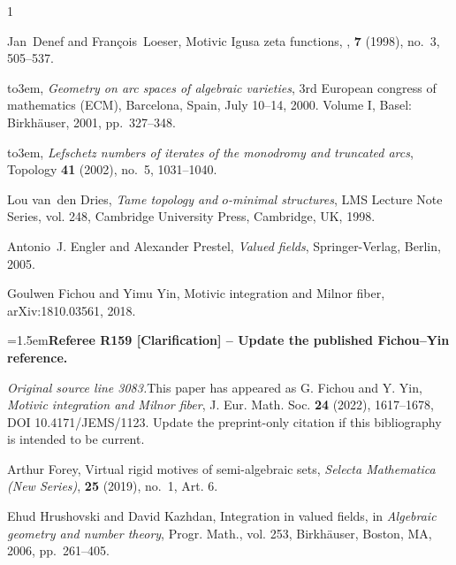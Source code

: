 \documentclass[12pt]{amsart}
\newcommand{\RefereeRemark}[4]{%
  \par\medskip\begingroup\normalfont\small\color{RefereePurple}%
  \emergencystretch=1.5em\noindent\textbf{Referee R#1 [#2] -- #3.}\par\nobreak\noindent #4\par
  \endgroup\medskip
}
\theoremstyle{plain}
\theoremstyle{definition}
\theoremstyle{remark}
\numberwithin{equation}{section}
\theoremstyle{plain}
\newcommand{\omin}{$o$\nobreakdash}
\newcommand{\0}{\emptyset}
\begin{document}
\providecommand{\bysame}{\leavevmode\hbox to3em{\hrulefill}\thinspace}
\providecommand{\MR}{\relax\ifhmode\unskip\space\fi MR }
\providecommand{\MRhref}[2]{%
  \href{http://www.ams.org/mathscinet-getitem?mr=#1}{#2}
}
\providecommand{\href}[2]{#2}
\begin{thebibliography}{1}

Jan~Denef and Fran\c cois~Loeser,
\newblock Motivic {{Igusa}} zeta functions,
, \textbf{7} (1998), no.~3, 505--537.

\bysame, \emph{{Geometry on arc spaces of algebraic varieties}}, {3rd European
  congress of mathematics (ECM), Barcelona, Spain, July 10--14, 2000. Volume
  I}, Basel: Birkh\"auser, 2001, pp.~327--348.

\bysame, \emph{Lefschetz numbers of iterates of the monodromy and truncated
  arcs}, Topology \textbf{41} (2002), no.~5, 1031--1040.

Lou van~den Dries, \emph{Tame topology and \omin-minimal structures}, LMS Lecture Note
  Series, vol. 248, Cambridge University Press, Cambridge, UK, 1998.

Antonio~J. Engler and Alexander Prestel, \emph{Valued fields}, Springer-Verlag,
  Berlin, 2005.

Goulwen Fichou and Yimu Yin, {Motivic integration and Milnor fiber}, arXiv:1810.03561, 2018.

\RefereeRemark{159}{Clarification}{Update the published Fichou--Yin reference}{%
\textit{Original source line 3083.}\quad This paper has appeared as G. Fichou and Y. Yin, \emph{Motivic integration and Milnor fiber}, J. Eur. Math. Soc. \textbf{24} (2022), 1617--1678, DOI \href{https://doi.org/10.4171/JEMS/1123}{10.4171/JEMS/1123}. Update the preprint-only citation if this bibliography is intended to be current.
}


Arthur Forey, {Virtual rigid motives of semi-algebraic sets}, {\em Selecta Mathematica (New Series)}, \textbf{25} (2019),  no.~1, Art. 6.


Ehud Hrushovski and David Kazhdan, {Integration in valued fields}, in
  {\em Algebraic geometry and number theory}, Progr. Math., vol. 253, Birkh\"{a}user,
  Boston, MA, 2006, pp.~261--405.


\end{thebibliography}
\end{document}
